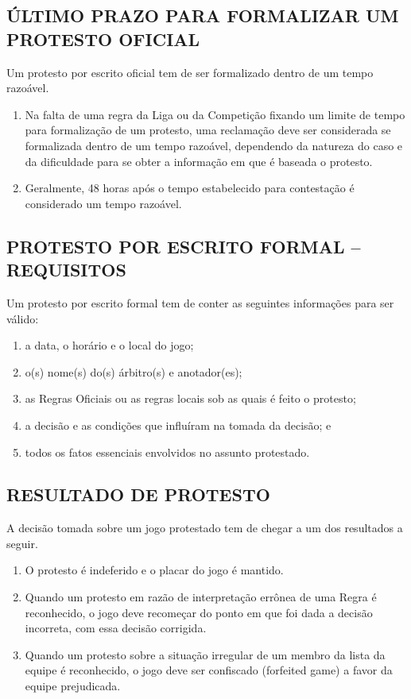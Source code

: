\subsection{ÚLTIMO PRAZO PARA FORMALIZAR UM PROTESTO OFICIAL}
 Um protesto por escrito oficial tem de ser formalizado dentro de um tempo razoável.

	\begin{enumerate}[label=(\alph*)]
		\item Na falta de uma regra da Liga ou da Competição fixando um limite de tempo para formali\-za\-ção de um protesto, uma reclamação deve ser considerada se formalizada dentro de um tempo razoável, dependendo da natureza do caso e da dificuldade para se obter a informação em que é baseada o protesto.
		\item Geralmente, 48 horas após o tempo estabelecido para contestação é considerado um tempo razoável.
	\end{enumerate}

\subsection{PROTESTO POR ESCRITO FORMAL -- REQUISITOS}

 Um protesto por escrito formal tem de conter as seguintes informações para ser válido:
\begin{enumerate}[label=(\alph*)]
	\item a data, o horário e o local do jogo;
 	\item o(s) nome(s) do(s) árbitro(s) e anotador(es);
 	\item as Regras Oficiais ou as regras locais sob as quais é feito o protesto;
 	\item a decisão e as condições que influíram na tomada da decisão; e
 	\item todos os fatos essenciais envolvidos no assunto protestado.
\end{enumerate}

\subsection{RESULTADO DE PROTESTO}

A decisão tomada sobre um jogo protestado tem de chegar a um dos resultados a seguir.

	\begin{enumerate}[label=(\alph*)]
		\item O protesto é indeferido e o placar do jogo é mantido.
	 	\item Quando um protesto em razão de interpretação errônea de uma Regra é  reconhecido, o jogo deve recomeçar do ponto em que foi dada a decisão incorreta, com essa decisão corrigida.
	 	\item Quando um protesto sobre a situação irregular de um membro da lista da  equipe é reconhecido, o jogo deve ser confiscado (\gls{forfeited game}) a favor da  equipe prejudicada.
	\end{enumerate}


